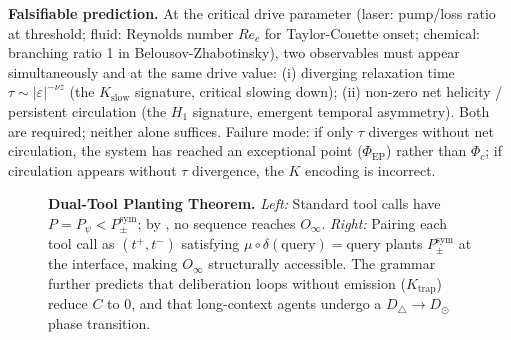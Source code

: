 \documentclass[12pt,a4paper]{article}
\newcommand{\Phic}{\Phi_c}
\newcommand{\Ppms}{P_{\pm}^{\text{sym}}}
\begin{document}
\textbf{Falsifiable prediction.} At the critical drive parameter
(laser: pump/loss ratio at threshold; fluid: Reynolds number $Re_c$
for Taylor-Couette onset; chemical: branching ratio 1 in
Belousov-Zhabotinsky), two observables must appear simultaneously and
at the same drive value: (i) diverging relaxation time $\tau \sim
|\varepsilon|^{-\nu z}$ (the $K_\text{slow}$ signature, critical
slowing down); (ii) non-zero net helicity / persistent circulation
(the $H_1$ signature, emergent temporal asymmetry). Both are required;
neither alone suffices. Failure mode: if only $\tau$ diverges without
net circulation, the system has reached an exceptional point
($\Phi_\text{EP}$) rather than $\Phic$; if circulation appears without
$\tau$ divergence, the $K$ encoding is incorrect.


\begin{figure}[H]
\centering
{}
\caption{\textbf{Dual-Tool Planting Theorem.}
\emph{Left:} Standard tool calls have $P = P_\psi < \Ppms$; by ,
no sequence reaches $O_\infty$. \emph{Right:} Pairing each tool call as $(t^+, t^-)$
satisfying $\mu \circ \delta(\text{query}) = \text{query}$ plants $\Ppms$ at the
interface, making $O_\infty$ structurally accessible. The grammar further predicts
that deliberation loops without emission ($K_\text{trap}$) reduce $C$ to $0$, and that
long-context agents undergo a $D_\triangle \to D_\odot$ phase transition.}
\label{fig:dual_tool}
\end{figure}
\end{document}
